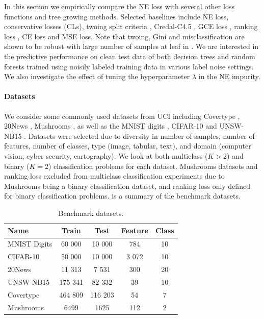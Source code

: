 \documentclass[letterpaper]{article} %
\begin{document}
In this section we empirically compare the NE loss with several other loss functions and tree growing methods. Selected baselines include
NE loss,
conservative losses (CLs),
twoing split criteria \cite{breiman1984classification},
Credal-C4.5 \cite{mantas2014credal},
GCE loss \cite{zhang2018generalized},
ranking loss \cite{yang2019robust},
CE loss and MSE loss.
Note that twoing, Gini and misclassification are shown to be robust with large number of samples at leaf in \cite{ghosh2017robustness}.
We are interested in the predictive performance on clean test data of both
decision trees and random forests trained using noisily labeled training data in
various label noise settings.
We also investigate the effect of tuning the hyperparameter $\lambda$ in the NE impurity.

\paragraph{Datasets}
We consider some commonly used datasets from UCI including Covertype \cite{misc_covertype_31}, 20News \cite{lang1995newsweeder}, Mushrooms \cite{misc_mushroom_73}, as well as the MNIST digits \cite{lecun1998gradient}, CIFAR-10 \cite{krizhevsky2009learning} and UNSW-NB15 \cite{moustafa2015unsw}.
Datasets were selected due to diversity in number of samples, number of features, number of classes, type (image, tabular, text), and domain (computer vision, cyber security, cartography).
We look at both multiclass ($K>2$) and binary ($K=2$) classification problems for each dataset. Mushrooms datasets and ranking loss excluded from multiclass classification experiments due to Mushrooms being a binary classification dataset, and ranking loss only defined for binary classification problems.
 is a summary of the benchmark datasets.


\begin{table}[t]
    \centering
    \begin{tabular}{lcccc}
        Name & Train & Test & Feature & Class  \\\hline
         MNIST Digits & 60 000 & 10 000 & 784 & 10 \\
         CIFAR-10 & 50 000 & 10 000 & 3 072 & 10 \\
         20News & 11 313 & 7 531 & 300 & 20 \\
         UNSW-NB15 & 175 341 & 82 332 & 39 & 10 \\
         Covertype & 464 809 & 116 203 & 54 & 7 \\
         Mushrooms & 6499 & 1625 & 112 & 2
    \end{tabular}
    \caption{Benchmark datasets.}
    \label{tab:datasets}
\end{table}
\end{document}
